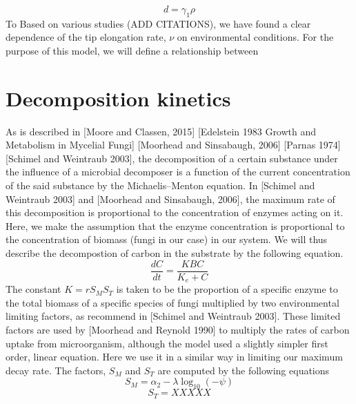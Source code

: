 \documentclass[10pt]{article}
\begin{document}
\begin{equation} \label {eq}
    d = \gamma_{1}\rho
\end{equation}
To 
Based on various studies (ADD CITATIONS), we have found a clear dependence of the tip elongation rate, $\nu$ on environmental conditions. For the purpose of this model, we will  define a relationship between 


\section*{Decomposition kinetics}
As is described in [Moore and Classen, 2015] [Edelstein 1983 Growth and Metabolism in Mycelial Fungi] [Moorhead and Sinsabaugh, 2006] [Parnas 1974] [Schimel and Weintraub 2003], the decomposition of a certain substance under the influence of a microbial decomposer is a function of the current concentration of the said substance by the Michaelis–Menton equation. In [Schimel and Weintraub 2003] and [Moorhead and Sinsabaugh, 2006], the maximum rate of this decomposition is proportional to the concentration of enzymes acting on it. Here, we make the assumption that the enzyme concentration is proportional to the concentration of biomass (fungi in our case) in our system. We will thus describe the decompostion of carbon in the substrate by the following equation.
\begin{equation} \label{eq}
    \frac{dC}{dt} = \frac{KBC}{K_{e}+C}
\end{equation}
The constant $K=rS_{M}S_{T}$ is taken to be the proportion of a specific enzyme to the total biomass of a specific species of fungi multiplied by two environmental limiting factors, as recommend in [Schimel and Weintraub 2003]. These limited factors are used by [Moorhead and Reynold 1990] to multiply the rates of carbon uptake from microorganism, although the model used a slightly simpler first order, linear equation. Here we use it in a similar way in limiting our maximum decay rate. The factors, $S_{M}$ and $S_{T}$ are computed by the following equations
\begin{equation} \label{eq}
    S_{M}=\alpha_{2} - \lambda \log_{10}(-\psi)
\end{equation}
\begin{equation} \label {eq}
    S_{T} = XXXXX
\end{equation}


\end{document}
